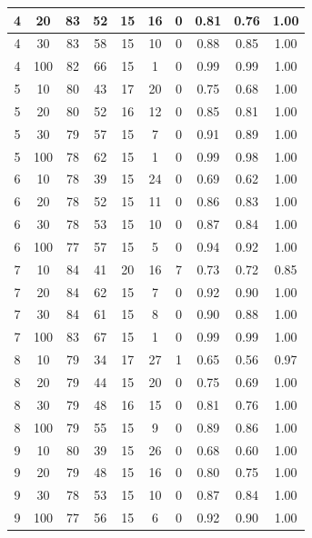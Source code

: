 \begin{longtable}{ |c|c|c|c|c|c|c|c|c|c| }
            4 & 20 & 83 & 52 & 15 & 16 & 0 & 0.81 & 0.76 & 1.00 \\ \hline
            4 & 30 & 83 & 58 & 15 & 10 & 0 & 0.88 & 0.85 & 1.00 \\ \hline
            4 & 100 & 82 & 66 & 15 & 1 & 0 & 0.99 & 0.99 & 1.00 \\ \hline
            5 & 10 & 80 & 43 & 17 & 20 & 0 & 0.75 & 0.68 & 1.00 \\ \hline
            5 & 20 & 80 & 52 & 16 & 12 & 0 & 0.85 & 0.81 & 1.00 \\ \hline
            5 & 30 & 79 & 57 & 15 & 7 & 0 & 0.91 & 0.89 & 1.00 \\ \hline
            5 & 100 & 78 & 62 & 15 & 1 & 0 & 0.99 & 0.98 & 1.00 \\ \hline
            6 & 10 & 78 & 39 & 15 & 24 & 0 & 0.69 & 0.62 & 1.00 \\ \hline
            6 & 20 & 78 & 52 & 15 & 11 & 0 & 0.86 & 0.83 & 1.00 \\ \hline
            6 & 30 & 78 & 53 & 15 & 10 & 0 & 0.87 & 0.84 & 1.00 \\ \hline
            6 & 100 & 77 & 57 & 15 & 5 & 0 & 0.94 & 0.92 & 1.00 \\ \hline
            7 & 10 & 84 & 41 & 20 & 16 & 7 & 0.73 & 0.72 & 0.85 \\ \hline
            7 & 20 & 84 & 62 & 15 & 7 & 0 & 0.92 & 0.90 & 1.00 \\ \hline
            7 & 30 & 84 & 61 & 15 & 8 & 0 & 0.90 & 0.88 & 1.00 \\ \hline
            7 & 100 & 83 & 67 & 15 & 1 & 0 & 0.99 & 0.99 & 1.00 \\ \hline
            8 & 10 & 79 & 34 & 17 & 27 & 1 & 0.65 & 0.56 & 0.97 \\ \hline
            8 & 20 & 79 & 44 & 15 & 20 & 0 & 0.75 & 0.69 & 1.00 \\ \hline
            8 & 30 & 79 & 48 & 16 & 15 & 0 & 0.81 & 0.76 & 1.00 \\ \hline
            8 & 100 & 79 & 55 & 15 & 9 & 0 & 0.89 & 0.86 & 1.00 \\ \hline
            9 & 10 & 80 & 39 & 15 & 26 & 0 & 0.68 & 0.60 & 1.00 \\ \hline
            9 & 20 & 79 & 48 & 15 & 16 & 0 & 0.80 & 0.75 & 1.00 \\ \hline
            9 & 30 & 78 & 53 & 15 & 10 & 0 & 0.87 & 0.84 & 1.00 \\ \hline
            9 & 100 & 77 & 56 & 15 & 6 & 0 & 0.92 & 0.90 & 1.00 \\ \hline

\end{longtable}
